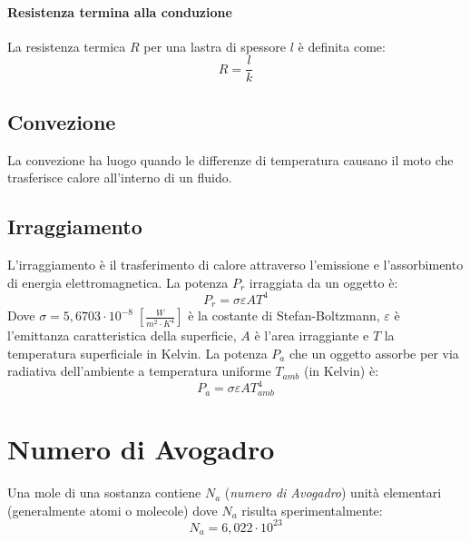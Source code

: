             \paragraph{Resistenza termina alla conduzione} La resistenza 
            termica $R$ per una lastra di spessore $l$ è definita come:
                \begin{equation}
                    R = \frac{l}{k}
                \end{equation}

            \subsection{Convezione} La convezione ha luogo quando le differenze
            di temperatura causano il moto che trasferisce calore all'interno 
            di un fluido.

            \subsection{Irraggiamento} L'irraggiamento è il trasferimento di 
            calore attraverso l'emissione e l'assorbimento di energia 
            elettromagnetica. La potenza $P_r$ irraggiata da un oggetto è:
                \begin{equation}
                    P_r = \sigma \varepsilon AT^4
                \end{equation}
            Dove $\sigma = 5,6703 \cdot 10^{-8} \; [\frac{W}{m^2 \cdot K^4}
            ]$ è la costante di Stefan-Boltzmann, $\varepsilon$ è l'emittanza
            caratteristica della superficie, $A$ è l'area irraggiante e $T$ la 
            temperatura superficiale in Kelvin. La potenza $P_a$ che un oggetto
            assorbe per via radiativa dell'ambiente a temperatura uniforme
            $T_{amb}$ (in Kelvin) è:
                \begin{equation}
                    P_a = \sigma \varepsilon AT^4_{amb}
                \end{equation}

    \section{Numero di Avogadro} Una mole di una sostanza contiene $N_a$
    (\textit{numero di Avogadro}) unità elementari (generalmente atomi o 
    molecole) dove $N_a$ risulta sperimentalmente:
        \begin{equation*}
            N_a = 6,022 \cdot 10^{23}
        \end{equation*}

